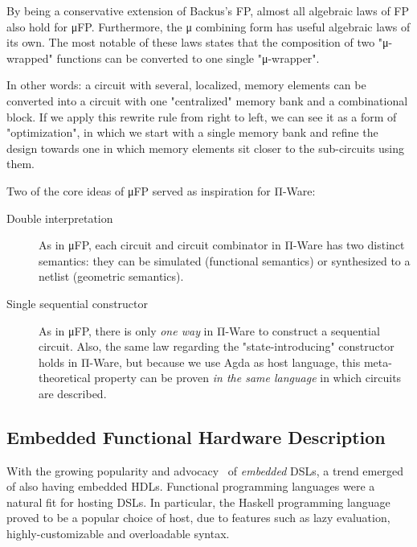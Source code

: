         By being a conservative extension of Backus's FP, almost all algebraic laws of FP also hold for μFP.
        Furthermore, the μ combining form has useful algebraic laws of its own.
        The most notable of these laws states that the composition of two "μ-wrapped" functions
        can be converted to one single "μ-wrapper".

        In other words: a circuit with several, localized, memory elements can be converted into a circuit
        with one "centralized" memory bank and a combinational block.
        If we apply this rewrite rule from right to left, we can see it as a form of "optimization",
        in which we start with a single memory bank and refine the design towards one in which
        memory elements sit closer to the sub-circuits using them.

        Two of the core ideas of μFP served as inspiration for Π-Ware:

        \begin{description}
            \item[Double interpretation] As in μFP,
                each circuit and circuit combinator in Π-Ware has two distinct semantics:
                they can be simulated (functional semantics) or synthesized to a netlist (geometric semantics).
            \item[Single sequential constructor] As in μFP,
                there is only \emph{one way} in Π-Ware to construct a sequential circuit.
                Also, the same law regarding the "state-introducing" constructor holds in Π-Ware,
                but because we use Agda as host language, this meta-theoretical property can be proven
                \emph{in the same language} in which circuits are described.
        \end{description}


        \subsection{Embedded Functional Hardware Description}
        \label{subsec:embedded-functional-hardware}
            With the growing popularity and advocacy~\cite{hudak-edsls} of \emph{embedded} \acp{DSL},
            a trend emerged of also having embedded \acp{HDL}.
            Functional programming languages were a natural fit for hosting \acp{DSL}.
            In particular, the Haskell programming language proved to be a popular choice of host,
            due to features such as lazy evaluation, highly-customizable and overloadable syntax.

